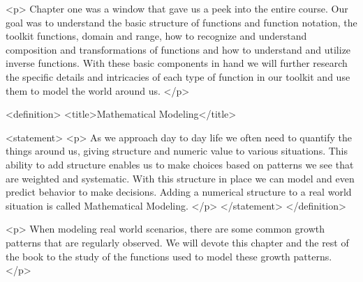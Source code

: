 <p>
    Chapter one was a window that gave us a peek into the entire course.
    Our goal was to understand the basic structure of functions and function notation, the toolkit functions, domain and range, how to recognize and understand composition and transformations of functions and how to understand and utilize inverse functions.
    With these basic components in hand we will further research the specific details and intricacies of each type of function in our toolkit and use them to model the world around us.
</p>

<definition>
    <title>Mathematical Modeling</title>

    <statement>
        <p>
            As we approach day to day life we often need to quantify the things around us, giving structure and numeric value to various situations.
            This ability to add structure enables us to make choices based on patterns we see that are weighted and systematic.
            With this structure in place we can model and even predict behavior to make decisions.
            Adding a numerical structure to a real world situation is called Mathematical Modeling.
        </p>
    </statement>
</definition>

<p>
    When modeling real world scenarios, there are some common growth patterns that are regularly observed.
    We will devote this chapter and the rest of the book to the study of the functions used to model these growth patterns.
</p>